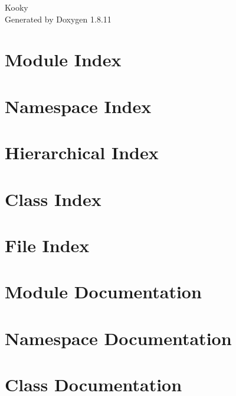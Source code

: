 \documentclass[twoside]{book}
\newcommand{\+}{\discretionary{\mbox{\scriptsize$\hookleftarrow$}}{}{}}
\newcommand{\clearemptydoublepage}{%
  \newpage{\pagestyle{empty}\cleardoublepage}%
}
\begin{document}
\hypersetup{pageanchor=false,
             bookmarksnumbered=true,
             pdfencoding=unicode
            }
\begin{titlepage}
\vspace*{7cm}
\begin{center}%
{\Large Kooky }\\
\vspace*{1cm}
{\large Generated by Doxygen 1.8.11}\\
\end{center}
\end{titlepage}
\clearemptydoublepage
\tableofcontents
\clearemptydoublepage
{}
\hypersetup{pageanchor=true}

\chapter{Module Index}

\chapter{Namespace Index}

\chapter{Hierarchical Index}

\chapter{Class Index}

\chapter{File Index}

\chapter{Module Documentation}


\chapter{Namespace Documentation}

\chapter{Class Documentation}





















\end{document}

